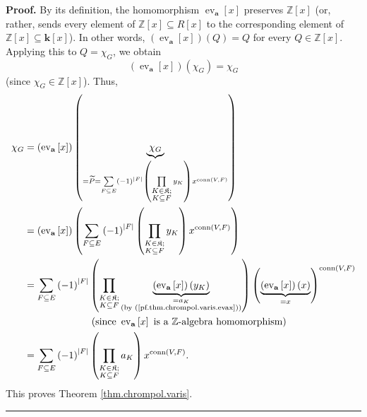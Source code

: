 \documentclass[numbers=enddot,12pt,final,onecolumn,notitlepage]{scrartcl}%
\theoremstyle{definition}
\newenvironment{proof}[1][Proof]{\noindent\textbf{#1.} }{\ \rule{0.5em}{0.5em}}
\newenvironment{verlong}{}{}
\let\sumnonlimits\sum
\let\prodnonlimits\prod
\renewcommand{\sum}{\sumnonlimits\limits}
\renewcommand{\prod}{\prodnonlimits\limits}
\begin{document}
\begin{verlong}
\begin{proof}
By its definition, the homomorphism $\operatorname*{ev}\nolimits_{\mathbf{a}%
}\left[  x\right]  $ preserves $\mathbb{Z}\left[  x\right]  $ (or, rather,
sends every element of $\mathbb{Z}\left[  x\right]  \subseteq R\left[
x\right]  $ to the corresponding element of $\mathbb{Z}\left[  x\right]
\subseteq\mathbf{k}\left[  x\right]  $). In other words, $\left(
\operatorname*{ev}\nolimits_{\mathbf{a}}\left[  x\right]  \right)  \left(
Q\right)  =Q$ for every $Q\in\mathbb{Z}\left[  x\right]  $. Applying this to
$Q=\chi_{G}$, we obtain%
\[
\left(  \operatorname*{ev}\nolimits_{\mathbf{a}}\left[  x\right]  \right)
\left(  \chi_{G}\right)  =\chi_{G}%
\]
(since $\chi_{G}\in\mathbb{Z}\left[  x\right]  $). Thus,%
\begin{align*}
\chi_{G}  &  =\left(  \operatorname*{ev}\nolimits_{\mathbf{a}}\left[
x\right]  \right)  \left(  \underbrace{\chi_{G}}_{=\widetilde{P}%
=\sum_{F\subseteq E}\left(  -1\right)  ^{\left\vert F\right\vert }\left(
\prod_{\substack{K\in\mathfrak{K};\\K\subseteq F}}y_{K}\right)
x^{\operatorname*{conn}\left(  V,F\right)  }}\right) \\
&  =\left(  \operatorname*{ev}\nolimits_{\mathbf{a}}\left[  x\right]  \right)
\left(  \sum_{F\subseteq E}\left(  -1\right)  ^{\left\vert F\right\vert
}\left(  \prod_{\substack{K\in\mathfrak{K};\\K\subseteq F}}y_{K}\right)
x^{\operatorname*{conn}\left(  V,F\right)  }\right) \\
&  =\sum_{F\subseteq E}\left(  -1\right)  ^{\left\vert F\right\vert }\left(
\prod_{\substack{K\in\mathfrak{K};\\K\subseteq F}}\underbrace{\left(
\operatorname*{ev}\nolimits_{\mathbf{a}}\left[  x\right]  \right)  \left(
y_{K}\right)  }_{\substack{=a_{K}\\\text{(by (\ref{pf.thm.chrompol.varis.evax}%
))}}}\right)  \left(  \underbrace{\left(  \operatorname*{ev}%
\nolimits_{\mathbf{a}}\left[  x\right]  \right)  \left(  x\right)  }%
_{=x}\right)  ^{\operatorname*{conn}\left(  V,F\right)  }\\
&  \ \ \ \ \ \ \ \ \ \ \ \ \ \ \ \ \ \ \ \ \left(  \text{since }%
\operatorname*{ev}\nolimits_{\mathbf{a}}\left[  x\right]  \text{ is a
}\mathbb{Z}\text{-algebra homomorphism}\right) \\
&  =\sum_{F\subseteq E}\left(  -1\right)  ^{\left\vert F\right\vert }\left(
\prod_{\substack{K\in\mathfrak{K};\\K\subseteq F}}a_{K}\right)
x^{\operatorname*{conn}\left(  V,F\right)  }.
\end{align*}
This proves Theorem \ref{thm.chrompol.varis}.
\end{proof}
\end{verlong}
\end{document}
